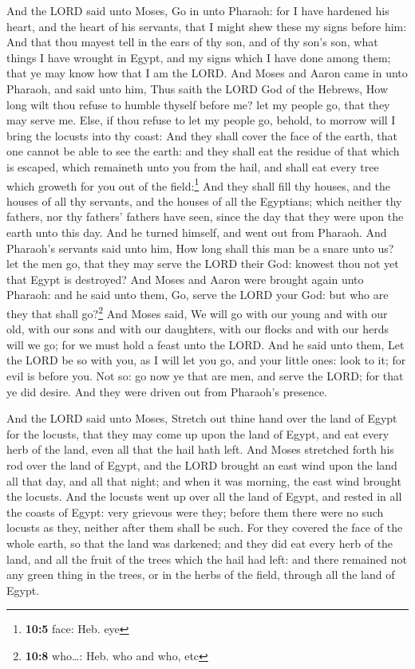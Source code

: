  And the LORD said unto Moses, Go in unto Pharaoh: for I
have hardened his heart, and the heart of his servants, that I might
shew these my signs before him:  And that thou mayest tell
in the ears of thy son, and of thy son's son, what things I have wrought
in Egypt, and my signs which I have done among them; that ye may know
how that I am the LORD.  And Moses and Aaron came in unto
Pharaoh, and said unto him, Thus saith the LORD God of the Hebrews, How
long wilt thou refuse to humble thyself before me? let my people go,
that they may serve me.  Else, if thou refuse to let my
people go, behold, to morrow will I bring the locusts into thy coast:
 And they shall cover the face of the earth, that one
cannot be able to see the earth: and they shall eat the residue of that
which is escaped, which remaineth unto you from the hail, and shall eat
every tree which groweth for you out of the field:\footnote{\textbf{10:5}
  face: Heb. eye}  And they shall fill thy houses, and the
houses of all thy servants, and the houses of all the Egyptians; which
neither thy fathers, nor thy fathers' fathers have seen, since the day
that they were upon the earth unto this day. And he turned himself, and
went out from Pharaoh.  And Pharaoh's servants said unto
him, How long shall this man be a snare unto us? let the men go, that
they may serve the LORD their God: knowest thou not yet that Egypt is
destroyed?  And Moses and Aaron were brought again unto
Pharaoh: and he said unto them, Go, serve the LORD your God: but who are
they that shall go?\footnote{\textbf{10:8} who\ldots: Heb. who and who,
  etc}  And Moses said, We will go with our young and with
our old, with our sons and with our daughters, with our flocks and with
our herds will we go; for we must hold a feast unto the LORD.
 And he said unto them, Let the LORD be so with you, as I
will let you go, and your little ones: look to it; for evil is before
you.  Not so: go now ye that are men, and serve the LORD;
for that ye did desire. And they were driven out from Pharaoh's
presence.

 And the LORD said unto Moses, Stretch out thine hand
over the land of Egypt for the locusts, that they may come up upon the
land of Egypt, and eat every herb of the land, even all that the hail
hath left.  And Moses stretched forth his rod over the
land of Egypt, and the LORD brought an east wind upon the land all that
day, and all that night; and when it was morning, the east wind brought
the locusts.  And the locusts went up over all the land
of Egypt, and rested in all the coasts of Egypt: very grievous were
they; before them there were no such locusts as they, neither after them
shall be such.  For they covered the face of the whole
earth, so that the land was darkened; and they did eat every herb of the
land, and all the fruit of the trees which the hail had left: and there
remained not any green thing in the trees, or in the herbs of the field,
through all the land of Egypt.

